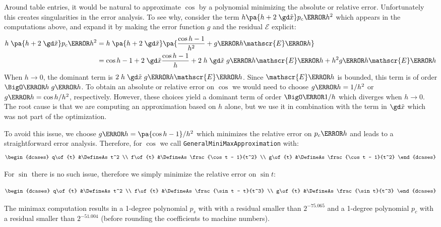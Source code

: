 \documentclass[10pt, a4paper, twoside]{basestyle}
\newcommand{\red}[1]{\tilde{#1}}
\begin{document}
Around table entries, it would be natural to approximate $\cos$ by a polynomial minimizing the absolute or relative error.  Unfortunately this creates singularities in the error analysis.  To see why, consider the term $h \pa{h + 2 \; \gd \red x} p_c\of{h^2}$ which appears in the computations above, and expand it by making the error function $g$ and the residual $\mathscr{E}$ explicit:
\begin{align*}
h \; \pa{h + 2 \; \gd \red x} p_c\of{h^2} &= h \; \pa{h + 2 \; \gd \red x} \pa{\frac{\cos h - 1}{h^2} + g\of{h} \mathscr{E}\of{h}} \\
&= \cos h - 1 + 2 \; \gd \red x \frac{\cos h - 1}{h} + 2 \; h \; \gd \red x \; g\of{h} \mathscr{E}\of{h} + h^2 g\of{h} \mathscr{E}\of{h}
\end{align*}
When $h \to 0$, the dominant term is $2 \; h \; \gd \red x \; g\of{h} \mathscr{E}\of{h}$.  Since $\mathscr{E}\of{h}$ is bounded, this term is of order $\BigO\of{h \; g\of{h}}$.  To obtain an absolute or relative error on $\cos$ we would need to choose $g\of{h} = 1/h^2$ or $g\of{h} = \cos h/h^2$, respectively.  However, these choices yield a dominant term of order $\BigO\of{1/h}$ which diverges when $h \to 0$.  The root cause is that we are computing an approximation based on $h$ alone, but we use it in combination with the term in $\gd \red x$ which was not part of the optimization.

To avoid this issue, we choose $g\of{h} = \pa{\cos h - 1}/h^2$ which minimizes the relative error on $p_c\of{h}$ and leads to a straightforward error analysis.  Therefore, for $\cos$ we call \texttt{GeneralMiniMaxApproximation} with:
\[
\begin{dcases}
q\of{t} &\DefineAs t^2 \\
f\of{t} &\DefineAs \frac{\cos t - 1}{t^2} \\
g\of{t} &\DefineAs \frac{\cos t - 1}{t^2}
\end{dcases}
\]

For $\sin$ there is no such issue, therefore we simply minimize the relative error on $\sin t$:

\[
\begin{dcases}
q\of{t} &\DefineAs t^2 \\
f\of{t} &\DefineAs \frac{\sin t - t}{t^3} \\
g\of{t} &\DefineAs \frac{\sin t}{t^3}
\end{dcases}
\]

The minimax computation results in a 1-degree polynomial $p_s$ with with a residual smaller than $2^{-75.065}$ and a 1-degree polynomial $p_c$ with a residual smaller than $2^{-51.004}$ (before rounding the coefficients to machine numbers).
\end{document}

